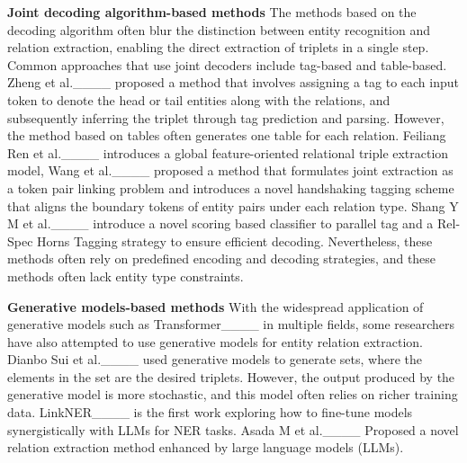 \textbf{Joint decoding algorithm-based methods} The methods based on the decoding algorithm often blur the distinction between entity recognition and relation extraction, enabling the direct extraction of triplets in a single step. Common approaches that use joint decoders include tag-based and table-based. Zheng et al.____ proposed a method that involves assigning a tag to each input token to denote the head or tail entities along with the relations, and subsequently inferring the triplet through tag prediction and parsing. However, the method based on tables often generates one table for each relation. Feiliang Ren et al.____ introduces a global feature-oriented relational triple extraction model, Wang et al.____ proposed a method that formulates joint extraction as a token pair linking problem and introduces a novel handshaking tagging scheme that aligns the boundary tokens of entity pairs under each relation type. Shang Y M et al.____ introduce a novel scoring based classifier to parallel tag and a Rel-Spec Horns Tagging strategy to ensure efficient decoding. Nevertheless, these methods often rely on predefined encoding and decoding strategies, and these methods often lack entity type constraints.

\textbf{Generative models-based methods} With the widespread application of generative models such as Transformer____ in multiple fields, some researchers have also attempted to use generative models for entity relation extraction. Dianbo Sui et al.____ used generative models to generate sets, where the elements in the set are the desired triplets. However, the output produced by the generative model is more stochastic, and this model often relies on richer training data. LinkNER____ is the first work exploring how to fine-tune models synergistically with LLMs for NER tasks. Asada M et al.____ Proposed a novel relation extraction method enhanced by large language models (LLMs).